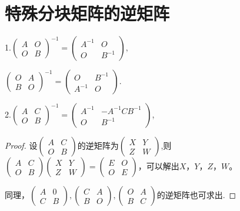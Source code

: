 \section{特殊分块矩阵的逆矩阵}

1.$\begin{pmatrix}
		A & O \\
		O & B
	\end{pmatrix}^{-1}=\begin{pmatrix}
		A^{-1} & O      \\
		O      & B^{-1}
	\end{pmatrix},$

$\begin{pmatrix}
		O & A \\
		B & O
	\end{pmatrix}^{-1}=\begin{pmatrix}
		O      & B^{-1} \\
		A^{-1} & O
	\end{pmatrix}$.

2.$\begin{pmatrix}
		A & C \\
		O & B
	\end{pmatrix}^{-1}=\begin{pmatrix}
		A^{-1} & -A^{-1}CB^{-1} \\
		O      & B^{-1}
	\end{pmatrix}$,

	\begin{proof}
		设$\begin{pmatrix}
			A & C \\
			O & B
		\end{pmatrix}$的逆矩阵为$\begin{pmatrix}
			X & Y \\
			Z & W
		\end{pmatrix}$,则$\begin{pmatrix}
			A & C \\
			O & B
		\end{pmatrix}\begin{pmatrix}
			X & Y \\
			Z & W
		\end{pmatrix}=\begin{pmatrix}
			E & O \\
			O & E
		\end{pmatrix}$，可以解出$X$，$Y$，$Z$，$W$。
	
	同理，$\begin{pmatrix}
			A & 0 \\
			C & B
		\end{pmatrix},\begin{pmatrix}
			C & A \\
			B & O
		\end{pmatrix},\begin{pmatrix}
			O & A \\
			B & C
		\end{pmatrix}$的逆矩阵也可求出.
	\end{proof}

